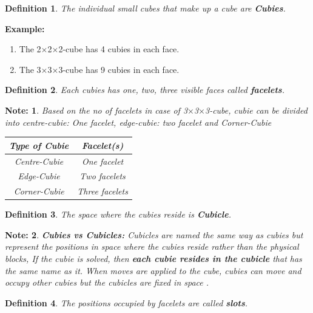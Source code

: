 \documentclass[12pt,a4paper]{article}
\theoremstyle{custom}
\newtheorem*{definition}{Definition}
\newtheorem*{note}{Note:}
\newcommand{\Ttwo}{2$\times$2$\times$2-}
\newcommand{\Tthree}{3$\times$3$\times$3-}
\begin{document}
 \begin{definition}
        The individual small cubes that make up a cube are \textbf{Cubies}.
        
    \end{definition}
    \textbf{Example: } 
    \begin{enumerate}
        \item The \Ttwo cube has 4 cubies in each face.
        \item The \Tthree cube has 9 cubies in each face.
    \end{enumerate}
    
    
 \begin{definition}
     Each cubies has one, two, three visible faces called \textbf{facelets}.
 \end{definition}

 \begin{note}
 Based on the no of facelets in case of \Tthree cube, cubie can be divided into \textit{centre-cubie: One facelet}, \textit{edge-cubie: two facelet} and \textit{Corner-Cubie}

\begin{center}
\begin{tabular}{|c|c|}
\hline
\textbf{Type of Cubie} & \textbf{Facelet(s)} \\
\hline
\textit{Centre-Cubie} & One facelet \\
\hline
\textit{Edge-Cubie} & Two facelets \\
\hline
\textit{Corner-Cubie} & Three facelets \\
\hline
\end{tabular}
\end{center}
 
 \end{note}
 
 \begin{definition}
        The space where the cubies reside is \textbf{Cubicle}. 
    \end{definition}

\begin{note}
   \textbf{Cubies vs Cubicles:} Cubicles are named the same way as cubies but represent the positions in space where the cubies reside rather than the physical blocks, If the cubie is solved, then \textbf{each cubie resides in the cubicle} that has the same name as it. When moves are applied to the cube, cubies can move and occupy other cubies but the cubicles are fixed in space \cite{wein2011mathematics}.
\end{note}
    \begin{definition}
        The positions occupied by facelets are called \textbf{slots}.
    \end{definition}
    
\end{document}
